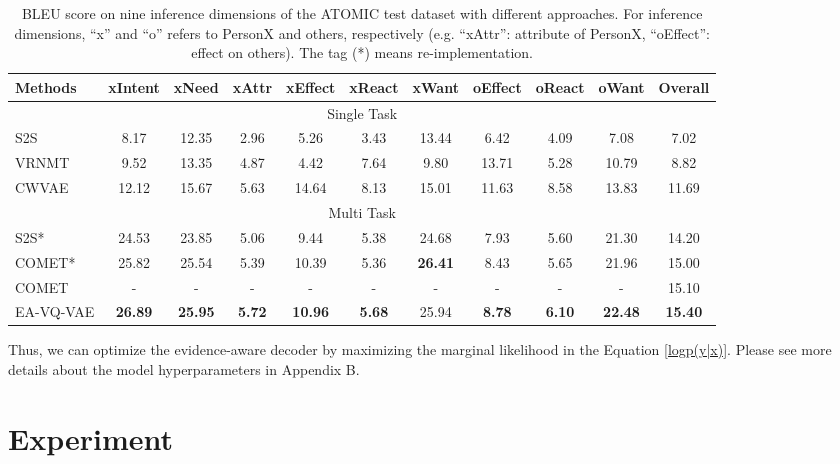 \documentclass[11pt,a4paper]{article}
\begin{document}
\begin{table*}[t!]
	\begin{center}
		{\small
			\begin{tabular}{l|cccccccccc} \hline 
Methods& xIntent &  xNeed & xAttr  & xEffect & xReact & xWant & oEffect& oReact& oWant&Overall\\
				\hline
				\hline
				\multicolumn{11}{c}{Single Task} \\
				\hline
				\hline
				
				S2S & 8.17 &  12.35  & 2.96 & 5.26 &3.43&13.44 &6.42 &4.09 &7.08&7.02\\
				
				VRNMT & 9.52 &  13.35  & 4.87 & 4.42 &7.64 &9.80 &13.71 &5.28&10.79&8.82\\
				
				CWVAE & 12.12 &  15.67  & 5.63 & 14.64 &8.13 &15.01 &11.63 &8.58&13.83&11.69\\
				\hline
				\hline
				\multicolumn{11}{c}{Multi Task} \\
				\hline
				\hline
				S2S* & 24.53 &  23.85  & 5.06 & 9.44 &5.38&24.68 &7.93 &5.60 &21.30&14.20\\
				COMET* & 25.82 &  25.54  & 5.39 & 10.39 &5.36 &\bf{26.41} &8.43 &5.65&21.96&15.00\\	
				COMET & - &  -  & - & - &- &- &- &-&-&15.10\\	
				EA-VQ-VAE & \bf{26.89} &  \bf{25.95}  & \bf{5.72} & \bf{10.96} &\bf{5.68} &25.94 &\bf{8.78} &\bf{6.10}&\bf{22.48}&\bf{15.40}\\	
				\hline
			\end{tabular}
		}
	\end{center}
	\caption{\label{table:ATOMIC_bleu} BLEU score on nine inference dimensions of the ATOMIC test dataset with different approaches. For inference dimensions, ``x'' and ``o'' refers to PersonX and others, respectively (e.g. ``xAttr'': attribute of PersonX, ``oEffect'': effect on others). The tag (*) means re-implementation.}
	\vspace{-0.4cm}
\end{table*}

Thus, we can optimize the evidence-aware decoder by maximizing the marginal likelihood in the Equation \ref{logp(y|x)}. Please see more details about the model hyperparameters in Appendix B.

\section{Experiment}
\end{document}
